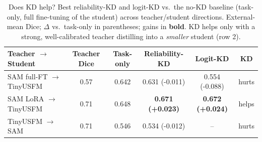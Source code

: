\begin{table}[t]
\centering
\caption{Does KD help? Best reliability-KD and logit-KD vs.\ the no-KD baseline
(task-only, full fine-tuning of the student) across teacher/student directions.
External-mean Dice; $\Delta$ vs.\ task-only in parentheses; gains in \textbf{bold}.
KD helps only with a strong, well-calibrated teacher distilling into a \emph{smaller}
student (row 2).}
\label{tab:kd_threeway}
\begin{tabular}{l c c c c c}
\toprule
Teacher $\to$ Student & Teacher Dice & Task-only & Reliability-KD & Logit-KD & KD \\
\midrule
SAM full-FT $\to$ TinyUSFM & 0.57 & 0.642 & 0.631 (-0.011) & 0.554 (-0.088) & hurts \\
SAM LoRA $\to$ TinyUSFM & 0.71 & 0.648 & \textbf{0.671 (+0.023)} & \textbf{0.672 (+0.024)} & helps \\
TinyUSFM $\to$ SAM & 0.71 & 0.546 & 0.534 (-0.012) & -- & hurts \\
\bottomrule
\end{tabular}
\end{table}

